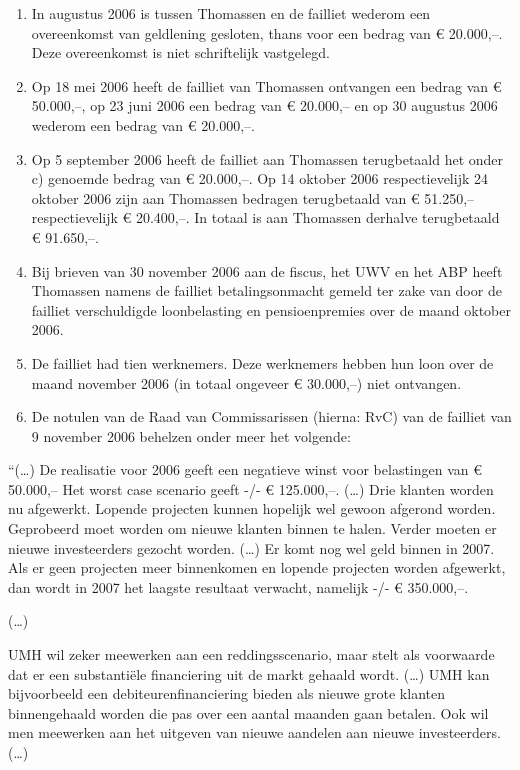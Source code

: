 \documentclass[
  dutch,
  a4paper,
]{article}
\begin{document}
\begin{enumerate}
\def\labelenumi{\alph{enumi}.}
\setcounter{enumi}{2}
\item
  In augustus 2006 is tussen Thomassen en de failliet wederom een overeenkomst van geldlening gesloten, thans voor een bedrag van € 20.000,--. Deze overeenkomst is niet schriftelijk vastgelegd.
\item
  Op 18 mei 2006 heeft de failliet van Thomassen ontvangen een bedrag van € 50.000,--, op 23 juni 2006 een bedrag van € 20.000,-- en op 30 augustus 2006 wederom een bedrag van € 20.000,--.
\item
  Op 5 september 2006 heeft de failliet aan Thomassen terugbetaald het onder c) genoemde bedrag van € 20.000,--. Op 14 oktober 2006 respectievelijk 24 oktober 2006 zijn aan Thomassen bedragen terugbetaald van € 51.250,-- respectievelijk € 20.400,--. In totaal is aan Thomassen derhalve terugbetaald € 91.650,--.
\item
  Bij brieven van 30 november 2006 aan de fiscus, het UWV en het ABP heeft Thomassen namens de failliet betalingsonmacht gemeld ter zake van door de failliet verschuldigde loonbelasting en pensioenpremies over de maand oktober 2006.
\item
  De failliet had tien werknemers. Deze werknemers hebben hun loon over de maand november 2006 (in totaal ongeveer € 30.000,--) niet ontvangen.
\item
  De notulen van de Raad van Commissarissen (hierna: RvC) van de failliet van 9 november 2006 behelzen onder meer het volgende:
\end{enumerate}

``(\ldots) De realisatie voor 2006 geeft een negatieve winst voor belastingen van € 50.000,-- Het worst case scenario geeft -/- € 125.000,--. (\ldots) Drie klanten worden nu afgewerkt. Lopende projecten kunnen hopelijk wel gewoon afgerond worden. Geprobeerd moet worden om nieuwe klanten binnen te halen. Verder moeten er nieuwe investeerders gezocht worden. (\ldots) Er komt nog wel geld binnen in 2007. Als er geen projecten meer binnenkomen en lopende projecten worden afgewerkt, dan wordt in 2007 het laagste resultaat verwacht, namelijk -/- € 350.000,--.

(\ldots)

UMH wil zeker meewerken aan een reddingsscenario, maar stelt als voorwaarde dat er een substantiële financiering uit de markt gehaald wordt. (\ldots) UMH kan bijvoorbeeld een debiteurenfinanciering bieden als nieuwe grote klanten binnengehaald worden die pas over een aantal maanden gaan betalen. Ook wil men meewerken aan het uitgeven van nieuwe aandelen aan nieuwe investeerders.(\ldots)
\end{document}

